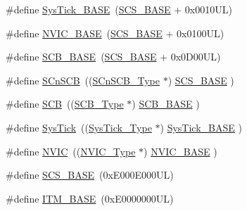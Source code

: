 \begin{DoxyCompactItemize}
\#define \mbox{\hyperlink{group___c_m_s_i_s__core__base_ga58effaac0b93006b756d33209e814646}{Sys\+Tick\+\_\+\+B\+A\+SE}}~(\mbox{\hyperlink{group___c_m_s_i_s__core__base_ga3c14ed93192c8d9143322bbf77ebf770}{S\+C\+S\+\_\+\+B\+A\+SE}} +  0x0010\+U\+L)
\item 
\#define \mbox{\hyperlink{group___c_m_s_i_s__core__base_gaa0288691785a5f868238e0468b39523d}{N\+V\+I\+C\+\_\+\+B\+A\+SE}}~(\mbox{\hyperlink{group___c_m_s_i_s__core__base_ga3c14ed93192c8d9143322bbf77ebf770}{S\+C\+S\+\_\+\+B\+A\+SE}} +  0x0100\+U\+L)
\item 
\#define \mbox{\hyperlink{group___c_m_s_i_s__core__base_gad55a7ddb8d4b2398b0c1cfec76c0d9fd}{S\+C\+B\+\_\+\+B\+A\+SE}}~(\mbox{\hyperlink{group___c_m_s_i_s__core__base_ga3c14ed93192c8d9143322bbf77ebf770}{S\+C\+S\+\_\+\+B\+A\+SE}} +  0x0\+D00\+U\+L)
\item 
\#define \mbox{\hyperlink{group___c_m_s_i_s__core__base_ga9fe0cd2eef83a8adad94490d9ecca63f}{S\+Cn\+S\+CB}}~((\mbox{\hyperlink{struct_s_cn_s_c_b___type}{S\+Cn\+S\+C\+B\+\_\+\+Type}}    $\ast$)     \mbox{\hyperlink{group___c_m_s_i_s__core__base_ga3c14ed93192c8d9143322bbf77ebf770}{S\+C\+S\+\_\+\+B\+A\+SE}}      )
\item 
\#define \mbox{\hyperlink{group___c_m_s_i_s__core__base_gaaaf6477c2bde2f00f99e3c2fd1060b01}{S\+CB}}~((\mbox{\hyperlink{struct_s_c_b___type}{S\+C\+B\+\_\+\+Type}}       $\ast$)     \mbox{\hyperlink{group___c_m_s_i_s__core__base_gad55a7ddb8d4b2398b0c1cfec76c0d9fd}{S\+C\+B\+\_\+\+B\+A\+SE}}      )
\item 
\#define \mbox{\hyperlink{group___c_m_s_i_s__core__base_gacd96c53beeaff8f603fcda425eb295de}{Sys\+Tick}}~((\mbox{\hyperlink{struct_sys_tick___type}{Sys\+Tick\+\_\+\+Type}}   $\ast$)     \mbox{\hyperlink{group___c_m_s_i_s__core__base_ga58effaac0b93006b756d33209e814646}{Sys\+Tick\+\_\+\+B\+A\+SE}}  )
\item 
\#define \mbox{\hyperlink{group___c_m_s_i_s__core__base_gac8e97e8ce56ae9f57da1363a937f8a17}{N\+V\+IC}}~((\mbox{\hyperlink{struct_n_v_i_c___type}{N\+V\+I\+C\+\_\+\+Type}}      $\ast$)     \mbox{\hyperlink{group___c_m_s_i_s__core__base_gaa0288691785a5f868238e0468b39523d}{N\+V\+I\+C\+\_\+\+B\+A\+SE}}     )
\item 
\#define \mbox{\hyperlink{group___c_m_s_i_s__core__base_ga3c14ed93192c8d9143322bbf77ebf770}{S\+C\+S\+\_\+\+B\+A\+SE}}~(0x\+E000\+E000\+U\+L)
\item 
\#define \mbox{\hyperlink{group___c_m_s_i_s__core__base_gadd76251e412a195ec0a8f47227a8359e}{I\+T\+M\+\_\+\+B\+A\+SE}}~(0x\+E0000000\+U\+L)

\end{DoxyCompactItemize}
